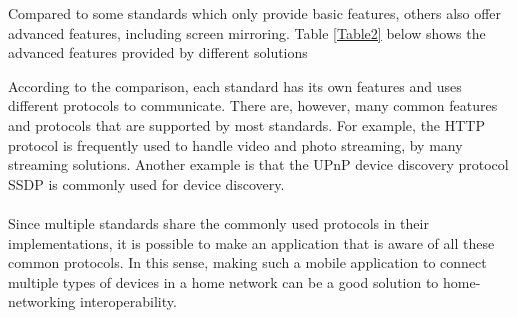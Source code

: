 \begin{enumerate}
Compared to some standards which only provide basic features, others also offer advanced 
features, including screen mirroring. Table \ref{Table2} below shows 
the advanced features provided by different solutions
\begin{table}[htb] 
\caption{Advanced feature comparison \label{Table2}} 
\begin{center} 
\end{center} 
\end{table} 


\end{enumerate} 

According to the comparison, each standard has its own features and uses 
different protocols to communicate. There are, however, many common features and protocols that are supported by most standards. For example, the HTTP protocol is frequently used to handle video 
and photo streaming, by many streaming solutions. Another example is that the UPnP device discovery protocol SSDP is commonly used for device discovery. \\
\\
Since multiple standards share the commonly used protocols in their implementations, it is possible to make an application that is aware of all these common protocols. In this sense, making such a mobile application to connect multiple types of devices in a home network can be a good solution to home-networking interoperability. 
